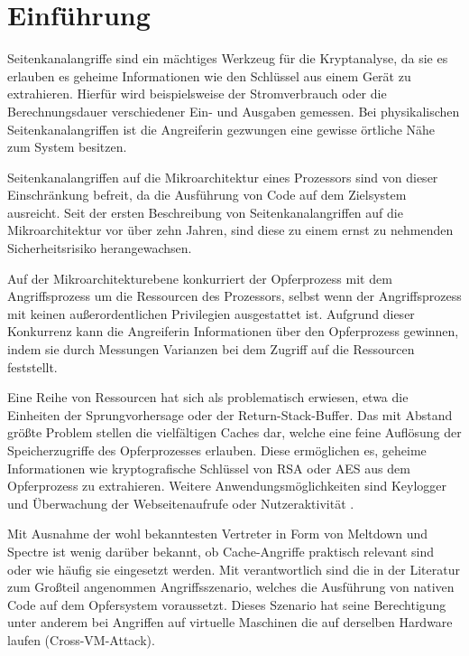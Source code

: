 \chapter{Einführung}
\label{chapter:introduction}


Seitenkanalangriffe sind ein mächtiges Werkzeug für die Kryptanalyse, da sie es erlauben  es geheime Informationen wie den  Schlüssel aus einem Gerät zu extrahieren.
Hierfür wird beispielsweise der Stromverbrauch oder die Berechnungsdauer verschiedener Ein- und Ausgaben gemessen.
Bei physikalischen Seitenkanalangriffen ist die Angreiferin gezwungen eine gewisse örtliche Nähe zum System besitzen.

Seitenkanalangriffen auf die Mikroarchitektur eines Prozessors sind von dieser Einschränkung befreit, da die
Ausführung von Code auf dem Zielsystem ausreicht.
Seit der ersten Beschreibung von Seitenkanalangriffen auf die Mikroarchitektur vor über zehn Jahren, sind diese zu einem ernst zu nehmenden Sicherheitsrisiko herangewachsen.

Auf der Mikroarchitekturebene konkurriert der Opferprozess mit dem Angriffsprozess um die Ressourcen des Prozessors, selbst wenn der Angriffsprozess mit keinen außerordentlichen Privilegien ausgestattet ist.
Aufgrund dieser Konkurrenz kann die Angreiferin Informationen über den Opferprozess gewinnen, indem sie durch Messungen Varianzen bei dem Zugriff auf die Ressourcen feststellt.

Eine Reihe von Ressourcen hat sich als problematisch erwiesen, etwa die Einheiten der Sprungvorhersage oder der Return-Stack-Buffer.
Das mit Abstand größte Problem stellen die vielfältigen Caches dar, welche eine feine Auflösung der Speicherzugriffe des Opferprozesses erlauben.
Diese ermöglichen es, geheime Informationen wie kryptografische Schlüssel von RSA \cite{CacheBleedOpenSSLRSA} oder AES \cite{BernsteinAES} aus dem Opferprozess zu extrahieren.
Weitere Anwendungsmöglichkeiten sind Keylogger \cite{Keylogger} und Überwachung der Webseitenaufrufe oder Nutzeraktivität \cite{TheSpyInTheSandbox}.

Mit Ausnahme der wohl bekanntesten Vertreter in Form von Meltdown und Spectre ist wenig darüber bekannt, ob Cache-Angriffe praktisch relevant sind oder wie häufig sie eingesetzt werden. 
Mit verantwortlich  sind die in der Literatur zum Großteil angenommen Angriffsszenario, welches die Ausführung von nativen Code auf dem Opfersystem voraussetzt.
Dieses Szenario hat seine Berechtigung unter anderem bei Angriffen auf virtuelle Maschinen die auf derselben Hardware laufen (Cross-VM-Attack).

